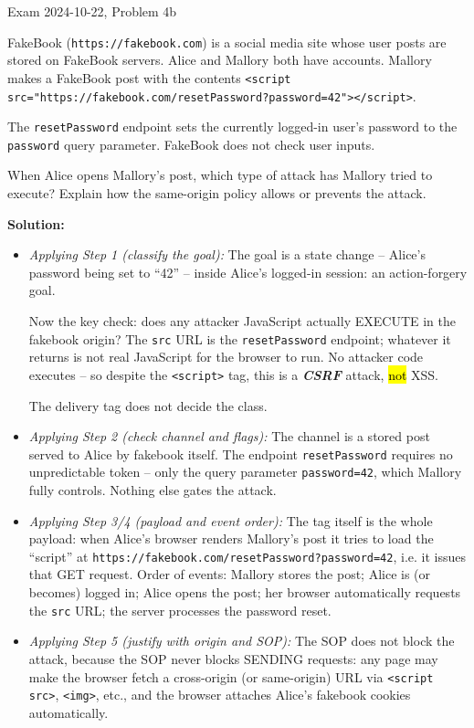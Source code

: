 \documentclass[12pt, a4paper]{article}
\newcommand{\term}[1]{\textbf{\textit{#1}}}        %
\newcommand{\imp}[1]{\hl{#1}}                       %
\begin{document}
\begin{practicebox}{Exam 2024-10-22, Problem 4b}
\begin{problembox}
FakeBook (\texttt{https://fakebook.com}) is a social media site whose user posts are stored on FakeBook servers. Alice and Mallory both have accounts. Mallory makes a FakeBook post with the contents \texttt{<script src="https://fakebook.com/resetPassword?password=42"></script>}.

The \texttt{resetPassword} endpoint sets the currently logged-in user's password to the \texttt{password} query parameter. FakeBook does not check user inputs.

When Alice opens Mallory's post, which type of attack has Mallory tried to execute? Explain how the same-origin policy allows or prevents the attack.
\end{problembox}

\textbf{Solution:}
\begin{itemize}
    \item \textit{Applying Step 1 (classify the goal):} The goal is a state change -- Alice's password being set to ``42'' -- inside Alice's logged-in session: an action-forgery goal.

    Now the key check: does any attacker JavaScript actually EXECUTE in the fakebook origin? The \texttt{src} URL is the \texttt{resetPassword} endpoint; whatever it returns is not real JavaScript for the browser to run. No attacker code executes -- so despite the \texttt{<script>} tag, this is a \term{CSRF} attack, \imp{not} XSS.

    The delivery tag does not decide the class.
    \item \textit{Applying Step 2 (check channel and flags):} The channel is a stored post served to Alice by fakebook itself. The endpoint \texttt{resetPassword} requires no unpredictable token -- only the query parameter \texttt{password=42}, which Mallory fully controls. Nothing else gates the attack.
    \item \textit{Applying Step 3/4 (payload and event order):} The tag itself is the whole payload: when Alice's browser renders Mallory's post it tries to load the ``script'' at \texttt{https://fakebook.com/resetPassword?password=42}, i.e. it issues that GET request.
    Order of events: Mallory stores the post; Alice is (or becomes) logged in; Alice opens the post; her browser automatically requests the \texttt{src} URL; the server processes the password reset.
    \item \textit{Applying Step 5 (justify with origin and SOP):} The SOP does not block the attack, because the SOP never blocks SENDING requests: any page may make the browser fetch a cross-origin (or same-origin) URL via \texttt{<script src>}, \texttt{<img>}, etc., and the browser attaches Alice's fakebook cookies automatically.


\end{itemize}
\end{practicebox}
\end{document}
